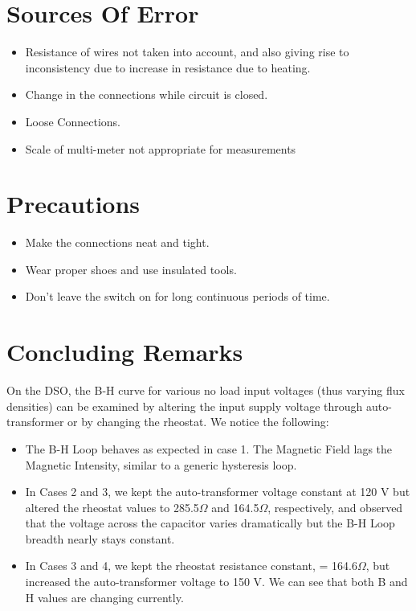\documentclass{article}
\begin{document}
\section{Sources Of Error}
\begin{itemize}
    \item Resistance of wires not taken into account, and also giving rise to inconsistency due to increase in resistance due to heating.
    \item Change in the connections while circuit is closed.
    \item Loose Connections.
    \item Scale of multi-meter not appropriate for measurements
\end{itemize}
\section{Precautions}
\begin{itemize}
    \item Make the connections neat and tight.
    \item Wear proper shoes and use insulated tools.
    \item Don’t leave the switch on for long continuous periods of time.
\end{itemize}
\section{Concluding Remarks}
On the DSO, the B-H curve for various no load input voltages (thus varying
flux densities) can be examined by altering the input supply voltage through
auto-transformer or by changing the rheostat. We notice the following:\\
\begin{itemize}
    \item The B-H Loop behaves as expected in case 1. The Magnetic Field lags
the Magnetic Intensity, similar to a generic hysteresis loop.
\item In Cases 2 and 3, we kept the auto-transformer voltage constant at 120
V but altered the rheostat values to 285.5$\Omega$ and 164.5$\Omega$, respectively, and
observed that the voltage across the capacitor varies dramatically but the
B-H Loop breadth nearly stays constant.
\item In Cases 3 and 4, we kept the rheostat resistance constant, = 164.6$\Omega$, but increased the auto-transformer voltage to 150 V. We can see that both B and H values are changing currently.
\end{itemize}
\end{document}
